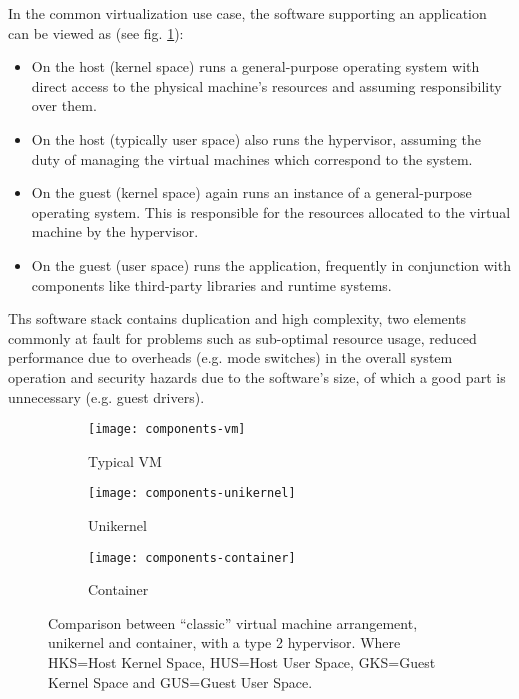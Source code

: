In the common virtualization use case, the software supporting an application
can be viewed as (see fig. \ref{fig:components-vm}):
\begin{itemize}
    \item On the host (kernel space) runs a general-purpose operating system
          with direct access to the physical machine's resources and assuming
          responsibility over them.
    \item On the host (typically user space) also runs the hypervisor, assuming
          the duty of managing the virtual machines which correspond to the
          system.
    \item On the guest (kernel space) again runs an instance of a
          general-purpose operating system. This is responsible for the
          resources allocated to the virtual machine by the hypervisor.
    \item On the guest (user space) runs the application, frequently in
          conjunction with components like third-party libraries and runtime
          systems.
\end{itemize}
Ths software stack contains duplication and high complexity, two elements
commonly at fault for problems such as sub-optimal resource usage, reduced
performance due to overheads (e.g. mode switches) in the overall system
operation and security hazards due to the software's size, of which a good part
is unnecessary (e.g. guest drivers).

\begin{figure}
    \centering
    \begin{subfigure}[b]{0.3\textwidth}
        \texttt{[image: components-vm]}
        \caption{Typical VM}
        \label{fig:components-vm}
    \end{subfigure}
    \begin{subfigure}[b]{0.3\textwidth}
        \texttt{[image: components-unikernel]}
        \caption{Unikernel}
        \label{fig:components-unikernel}
    \end{subfigure}
    \begin{subfigure}[b]{0.3\textwidth}
        \texttt{[image: components-container]}
        \caption{Container}
        \label{fig:components-container}
    \end{subfigure}
    \caption[Comparison between ``classic'' virtual machine arrangement,
        unikernel and container]{Comparison between ``classic'' virtual machine
        arrangement, unikernel and container, with a type 2 hypervisor. Where
        HKS=Host Kernel Space, HUS=Host User Space, GKS=Guest Kernel Space and
        GUS=Guest User Space.}
    \label{fig:vm-unikernel-container}
\end{figure}

